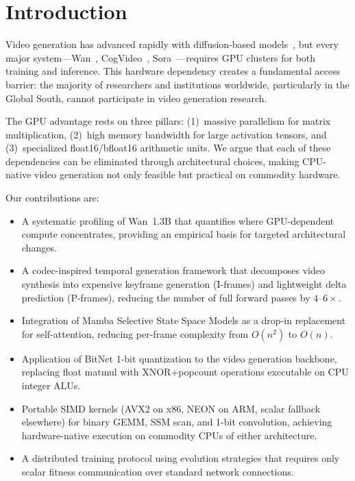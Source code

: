 \documentclass[11pt]{article}
\begin{document}
\section{Introduction}

Video generation has advanced rapidly with diffusion-based models~\citep{ho2022video, blattmann2023videoldm}, but every major system---Wan~\citep{wan2024}, CogVideo~\citep{hong2022cogvideo}, Sora~\citep{openai2024sora}---requires GPU clusters for both training and inference. This hardware dependency creates a fundamental access barrier: the majority of researchers and institutions worldwide, particularly in the Global South, cannot participate in video generation research.

The GPU advantage rests on three pillars: (1)~massive parallelism for matrix multiplication, (2)~high memory bandwidth for large activation tensors, and (3)~specialized float16/bfloat16 arithmetic units. We argue that each of these dependencies can be eliminated through architectural choices, making CPU-native video generation not only feasible but practical on commodity hardware.

Our contributions are:

\begin{itemize}[leftmargin=2em, itemsep=0.2em]
  \item A systematic profiling of Wan~1.3B that quantifies where GPU-dependent compute concentrates, providing an empirical basis for targeted architectural changes.
  \item A codec-inspired temporal generation framework that decomposes video synthesis into expensive keyframe generation (I-frames) and lightweight delta prediction (P-frames), reducing the number of full forward passes by $4$--$6\times$.
  \item Integration of Mamba Selective State Space Models as a drop-in replacement for self-attention, reducing per-frame complexity from $O(n^2)$ to $O(n)$.
  \item Application of BitNet 1-bit quantization to the video generation backbone, replacing float matmul with XNOR+popcount operations executable on CPU integer ALUs.
  \item Portable SIMD kernels (AVX2 on x86, NEON on ARM, scalar fallback elsewhere) for binary GEMM, SSM scan, and 1-bit convolution, achieving hardware-native execution on commodity CPUs of either architecture.
  \item A distributed training protocol using evolution strategies that requires only scalar fitness communication over standard network connections.
\end{itemize}
\end{document}
